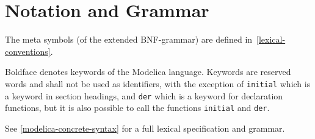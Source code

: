 \section{Notation and Grammar}\label{notation-and-grammar}

The meta symbols (of the extended BNF-grammar) are defined in~\cref{lexical-conventions}.

Boldface denotes keywords of the Modelica language. Keywords are
reserved words and shall not be used as identifiers, with the exception of
\lstinline!initial! which is a keyword in section headings, and \lstinline!der! which is a
keyword for declaration functions, but it is also possible to call the
functions \lstinline!initial! and \lstinline!der!.

See \cref{modelica-concrete-syntax} for a full lexical specification and grammar.
